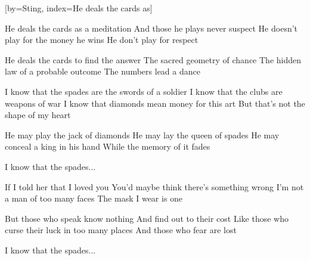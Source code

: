 [by={Sting},
                     index={He deals the cards as}]
\beginverse

He deals the cards as a meditation
And those he plays never suspect
He doesn't play for the money he wins
He don't play for respect

\endverse
\beginverse

He deals the cards to find the answer
The sacred geometry of chance
The hidden law of a probable outcome
The numbers lead a dance

\endverse
\beginverse

I know that the spades are the swords of a soldier
I know that the clubs are weapons of war
I know that diamonds mean money for this art
But that's not the shape of my heart

\endverse
\beginverse

He may play the jack of diamonds
He may lay the queen of spades
He may conceal a king in his hand
While the memory of it fades

\endverse
\beginverse

I know that the spades...

\endverse
\beginverse

If I told her that I loved you
You'd maybe think there's something wrong
I'm not a man of too many faces
The mask I wear is one

\endverse
\beginverse

But those who speak know nothing
And find out to their cost
Like those who curse their luck in too many places
And those who fear are lost

\endverse
\beginverse

I know that the spades...

\endverse
\endsong